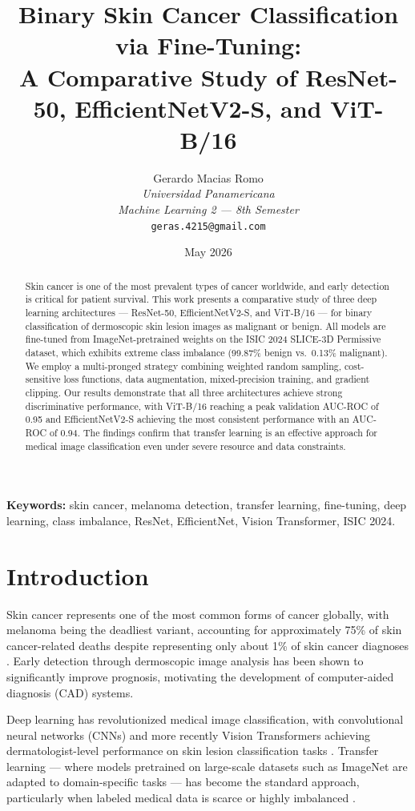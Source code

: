 \documentclass[11pt, a4paper, twocolumn]{article}
\title{
    \textbf{Binary Skin Cancer Classification via Fine-Tuning:\\
    A Comparative Study of ResNet-50, EfficientNetV2-S, and ViT-B/16}
}
\author{
    Gerardo Macias Romo\\[2pt]
    \textit{Universidad Panamericana}\\[2pt]
    \textit{Machine Learning 2 --- 8th Semester}\\[2pt]
    \texttt{geras.4215@gmail.com}
}
\date{May 2026}
\begin{document}
\maketitle

\begin{abstract}
Skin cancer is one of the most prevalent types of cancer worldwide,
and early detection is critical for patient survival. This work presents
a comparative study of three deep learning architectures ---
ResNet-50, EfficientNetV2-S, and ViT-B/16 --- for binary classification
of dermoscopic skin lesion images as malignant or benign.
All models are fine-tuned from ImageNet-pretrained weights on the
ISIC 2024 SLICE-3D Permissive dataset, which exhibits extreme class
imbalance (99.87\% benign vs.\ 0.13\% malignant). We employ a
multi-pronged strategy combining weighted random sampling,
cost-sensitive loss functions, data augmentation, mixed-precision
training, and gradient clipping. Our results demonstrate that all three
architectures achieve strong discriminative performance, with
ViT-B/16 reaching a peak validation AUC-ROC of 0.95 and
EfficientNetV2-S achieving the most consistent performance with
an AUC-ROC of 0.94. The findings confirm that transfer learning
is an effective approach for medical image classification even under
severe resource and data constraints.
\end{abstract}

\textbf{Keywords:} skin cancer, melanoma detection, transfer learning,
fine-tuning, deep learning, class imbalance, ResNet, EfficientNet,
Vision Transformer, ISIC 2024.

\section{Introduction}
\label{sec:introduction}

Skin cancer represents one of the most common forms of cancer globally,
with melanoma being the deadliest variant, accounting for approximately
75\% of skin cancer-related deaths despite representing only about 1\%
of skin cancer diagnoses \cite{siegel2023}. Early detection through
dermoscopic image analysis has been shown to significantly improve
prognosis, motivating the development of computer-aided diagnosis (CAD)
systems.

Deep learning has revolutionized medical image classification, with
convolutional neural networks (CNNs) and more recently Vision
Transformers achieving dermatologist-level performance on skin lesion
classification tasks \cite{esteva2017, dosovitskiy2021}. Transfer
learning --- where models pretrained on large-scale datasets such as
ImageNet are adapted to domain-specific tasks --- has become the
standard approach, particularly when labeled medical data is scarce
or highly imbalanced \cite{he2016, tan2021}.
\end{document}
